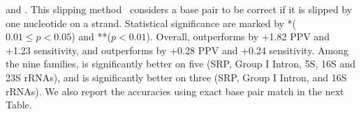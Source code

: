 \begin{table*}[h]
{    \viennarnafold and \linearfoldv.
    This slipping method~\cite{sloma+mathews:2016}  considers a base pair to
    be correct if it is slipped by one nucleotide on a strand. 
    Statistical significance are marked by 
    *($0.01\leq p<0.05$) and **($p<0.01$).
    Overall, \linearfoldc outperforms \contrafoldmfe by +1.82 PPV and +1.23 sensitivity, %
    and \linearfoldv outperforms \viennarnafold by +0.28 PPV and +0.24 sensitivity.
    Among the nine families, \linearfoldc is significantly better on five (SRP, Group I Intron, 5S, 16S and 23S rRNAs), %
    and \linearfoldv is significantly better on three (SRP, Group I Intron, and 16S rRNAs). %
    We also report the accuracies using exact base pair match in the next Table.
    \label{tab:accuracy}}
\end{table*}

